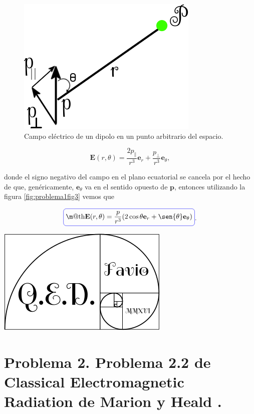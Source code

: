 \documentclass[a4paper,11pt]{article}
\makeatletter
\numberwithin{equation}{section}
\newcommand*{\boxcolor}{blue}
\renewcommand{\boxed}[1]{\textcolor{\boxcolor}{%
\tikz[baseline={([yshift=-1ex]current bounding box.center)}] \node [rectangle, minimum width=1ex,rounded corners,draw] {\normalcolor\m@th$\displaystyle#1$};}}
\makeatother
\begin{document}
\begin{figure}[H]
 \center 
 \includegraphics[scale=0.5]{problema1fig3}
 \caption{Campo eléctrico de un dipolo en un punto arbitrario del espacio.}
 \label{fig:problema1fig3}
\end{figure}

\begin{equation}
 \mathbf{E}(r,\theta) = \frac{2p_\parallel}{r^3} \mathbf{e}_r + 
 \frac{p_\bot}{r^3}\mathbf{e}_\theta,
\end{equation}

donde el signo negativo del campo en el plano ecuatorial se cancela por el hecho de 
que, genéricamente, $\mathbf{e}_\theta$ va en el sentido opuesto de $\mathbf{p}$, 
entonces utilizando la figura \eqref{fig:problema1fig3} vemos que 

\begin{equation}
 \boxed{\mathbf{E}(r,\theta) = \frac{p}{r^3}(2\cos{\theta}\mathbf{e}_r + 
 \sen{\theta}\mathbf{e}_\theta)}.
\end{equation}

\hspace{10cm}\includegraphics[scale=0.25]{logoQED}

\section{Problema 2. Problema 2.2 de Classical Electromagnetic Radiation
de Marion y Heald \cite{marion2}.}
\end{document}
